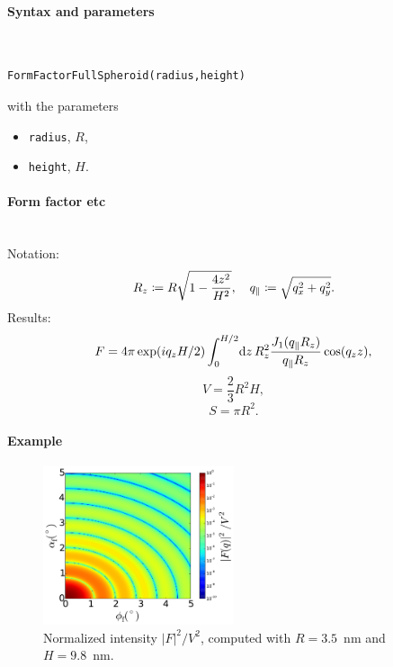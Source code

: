 \FloatBarrier

\paragraph{Syntax and parameters}\strut\\[-2ex plus .2ex minus .2ex]
\begin{lstlisting}[language=python, style=eclipseboxed,numbers=none,nolol]
  FormFactorFullSpheroid(radius,height)
\end{lstlisting}
with the parameters
\begin{itemize}
\item \texttt{radius}, $R$,
\item \texttt{height}, $H$.
\end{itemize}


\paragraph{Form factor etc}\strut\\
Notation:
\begin{equation*}
 R_z \coloneqq R\sqrt{1-\frac{4z^2}{H^2}},\quad
 q_\parallel \coloneqq \sqrt{q_x^2+q_y^2}.
\end{equation*}
Results:
\begin{equation*}
  F = 4\pi \exp(i q_z H/2) \int_0^{H/2} \!\text{d} z\,
     R_z^2 \frac{J_1(q_{\parallel}R_z)}{q_{\parallel}R_z} \cos(q_z z),
\end{equation*}
\begin{equation*}
  V =\dfrac{2}{3}R^2H,
\end{equation*}
\begin{equation*}
  S =\pi R^2.
\end{equation*}

\paragraph{Example}\strut

\begin{figure}[H]
\begin{center}
\includegraphics[width=0.5\textwidth]{fig/ff2/ff_FullSpheroid.pdf}
\end{center}
\caption{Normalized intensity $|F|^2/V^2$,
computed with $R=3.5$~nm and $H=9.8$~nm.}
\end{figure}

